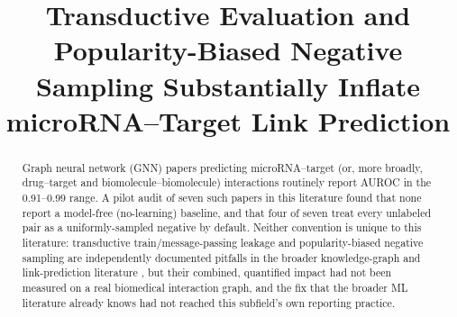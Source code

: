 \documentclass{bmcart}
\begin{document}
\begin{frontmatter}

\begin{fmbox}

\title{Transductive Evaluation and Popularity-Biased Negative Sampling Substantially
Inflate microRNA--Target Link Prediction}

\author[
   addressref={aff1},
   corref={aff1},
   email={dr.ulisesmoya@gmail.com}
]{ }

\address[id=aff1]{%
  ,
  ,
}

\end{fmbox}

\begin{abstractbox}

\begin{abstract}
Graph neural network (GNN) papers predicting microRNA--target (or, more broadly,
drug--target and biomolecule--biomolecule) interactions routinely report AUROC in the
0.91--0.99 range. A pilot audit of seven such papers in this literature found that none
report a model-free (no-learning) baseline, and that four of seven treat every unlabeled
pair as a uniformly-sampled negative by default. Neither convention is unique to this
literature: transductive train/message-passing leakage and popularity-biased negative
sampling are independently documented pitfalls in the broader knowledge-graph and
link-prediction literature \cite{toutanova2015observed,zhu2023pitfalls,li2023evaluating,
kotnis2017analysis,aiyappa2024implicit}, but their combined, quantified impact had not
been measured on a real biomedical interaction graph, and the fix that the broader ML
literature already knows had not reached this subfield's own reporting practice.


\end{abstract}
\end{abstractbox}
\end{frontmatter}
\end{document}
